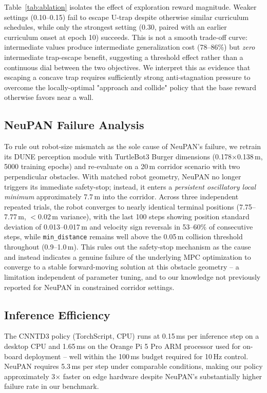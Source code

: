 Table~\ref{tab:ablation} isolates the effect of exploration reward
magnitude. Weaker settings (0.10--0.15) fail to escape U-trap despite
otherwise similar curriculum schedules, while only the strongest
setting (0.30, paired with an earlier curriculum onset at epoch 10)
succeeds. This is not a smooth trade-off curve: intermediate values
produce intermediate generalization cost (78--86\%) but \emph{zero}
intermediate trap-escape benefit, suggesting a threshold effect rather
than a continuous dial between the two objectives. We interpret this
as evidence that escaping a concave trap requires sufficiently strong
anti-stagnation pressure to overcome the locally-optimal "approach and
collide" policy that the base reward otherwise favors near a wall.

\subsection{NeuPAN Failure Analysis}
\label{sec:neupan-analysis}

To rule out robot-size mismatch as the sole cause of NeuPAN's failure,
we retrain its DUNE perception module with TurtleBot3 Burger dimensions
(0.178$\times$0.138\,m, 5000 training epochs) and re-evaluate on a
20\,m corridor scenario with two perpendicular obstacles. With matched
robot geometry, NeuPAN no longer triggers its immediate safety-stop;
instead, it enters a \emph{persistent oscillatory local minimum}
approximately 7.7\,m into the corridor. Across three independent
repeated trials, the robot converges to nearly identical terminal
positions (7.75--7.77\,m, $<$0.02\,m variance), with the last 100
steps showing position standard deviation of 0.013--0.017\,m and
velocity sign reversals in 53--60\% of consecutive steps, while
\texttt{min\_distance} remains well above the 0.05\,m collision
threshold throughout (0.9--1.0\,m). This rules out the safety-stop
mechanism as the cause and instead indicates a genuine failure of the
underlying MPC optimization to converge to a stable forward-moving
solution at this obstacle geometry -- a limitation independent of
parameter tuning, and to our knowledge not previously reported for
NeuPAN in constrained corridor settings.

\subsection{Inference Efficiency}

The CNNTD3 policy (TorchScript, CPU) runs at 0.15\,ms per inference
step on a desktop CPU and 1.65\,ms on the Orange Pi 5 Pro ARM
processor used for on-board deployment -- well within the 100\,ms
budget required for 10\,Hz control. NeuPAN requires 5.3\,ms per step
under comparable conditions, making our policy approximately 3$\times$
faster on edge hardware despite NeuPAN's substantially higher failure
rate in our benchmark.
